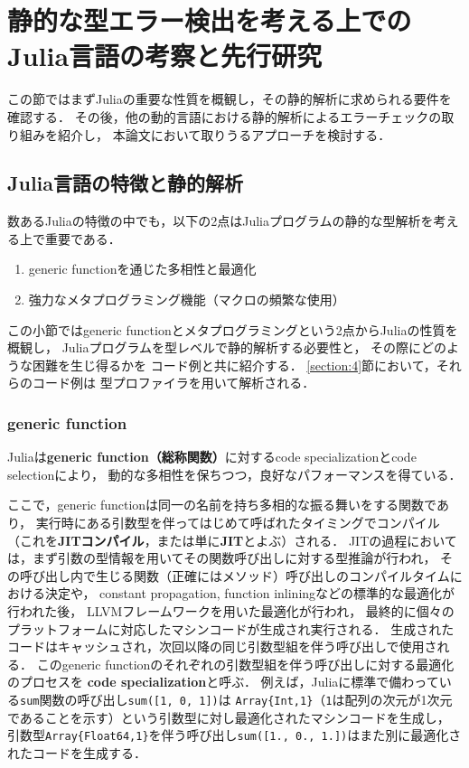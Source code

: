 
\section{静的な型エラー検出を考える上でのJulia言語の考察と先行研究} \label{section:2}

この節ではまずJuliaの重要な性質を概観し，その静的解析に求められる要件を確認する．
その後，他の動的言語における静的解析によるエラーチェックの取り組みを紹介し，
本論文において取りうるアプローチを検討する．


\subsection{Julia言語の特徴と静的解析} \label{subsection:2-1}

数あるJuliaの特徴の中でも，以下の2点はJuliaプログラムの静的な型解析を考える上で重要である．

\begin{enumerate}
  \item generic functionを通じた多相性と最適化
  \item 強力なメタプログラミング機能（マクロの頻繁な使用）
\end{enumerate}

この小節ではgeneric functionとメタプログラミングという2点からJuliaの性質を概観し，
Juliaプログラムを型レベルで静的解析する必要性と，
その際にどのような困難を生じ得るかを
コード例と共に紹介する．
\ref{section:4}節において，それらのコード例は
型プロファイラを用いて解析される．

\subsubsection{generic function} \label{subsubsection:generic-function}

Juliaは\textbf{generic function（総称関数）}に対するcode specializationとcode selectionにより，
動的な多相性を保ちつつ，良好なパフォーマンスを得ている\cite{jeff-phd}．

ここで，generic functionは同一の名前を持ち多相的な振る舞いをする関数であり，
実行時にある引数型を伴ってはじめて呼ばれたタイミングでコンパイル
（これを\textbf{JITコンパイル}，または単に\textbf{JIT}とよぶ）される．
JITの過程においては，まず引数の型情報を用いてその関数呼び出しに対する型推論が行われ，
その呼び出し内で生じる関数（正確にはメソッド）呼び出しのコンパイルタイムにおける決定や，
constant propagation, function inliningなどの標準的な最適化が行われた後，
LLVMフレームワーク\cite{LLVM}を用いた最適化が行われ，
最終的に個々のプラットフォームに対応したマシンコードが生成され実行される．
生成されたコードはキャッシュされ，次回以降の同じ引数型組を伴う呼び出しで使用される．
このgeneric functionのそれぞれの引数型組を伴う呼び出しに対する最適化のプロセスを
\textbf{code specialization}と呼ぶ．
例えば，Juliaに標準で備わっている\verb|sum|関数の呼び出し\verb|sum([1, 0, 1])|は
\verb|Array{Int,1}|（\verb|1|は配列の次元が1次元であることを示す）という引数型に対し最適化されたマシンコードを生成し，
引数型\verb|Array{Float64,1}|を伴う呼び出し\verb|sum([1., 0., 1.])|はまた別に最適化されたコードを生成する．

